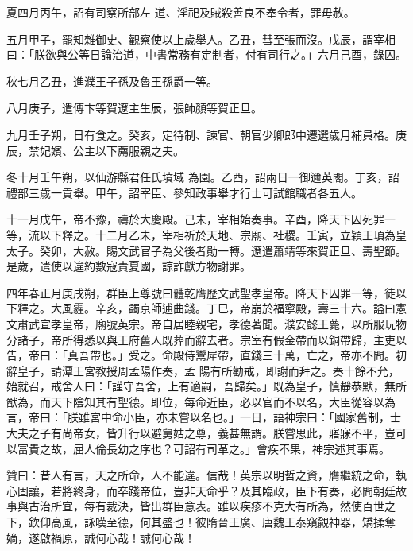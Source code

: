 \begin{pinyinscope}
 夏四月丙午，詔有司察所部左
 道、淫祀及賊殺善良不奉令者，罪毋赦。



 五月甲子，罷知雜御史、觀察使以上歲舉人。乙丑，彗至張而沒。戊辰，謂宰相曰：「朕欲與公等日論治道，中書常務有定制者，付有司行之。」六月己酉，錄囚。



 秋七月乙丑，進濮王子孫及魯王孫爵一等。



 八月庚子，遣傅卞等賀遼主生辰，張師顏等賀正旦。



 九月壬子朔，日有食之。癸亥，定待制、諫官、朝官少卿郎中遷選歲月補員格。庚辰，禁妃嬪、公主以下薦服親之夫。



 冬十月壬午朔，以仙游縣君任氏墳域
 為園。乙酉，詔兩日一御邇英閣。丁亥，詔禮部三歲一貢舉。甲午，詔宰臣、參知政事舉才行士可試館職者各五人。



 十一月戊午，帝不豫，禱於大慶殿。己未，宰相始奏事。辛酉，降天下囚死罪一等，流以下釋之。十二月乙未，宰相祈於天地、宗廟、社稷。壬寅，立穎王頊為皇太子。癸卯，大赦。賜文武官子為父後者勛一轉。遼遣蕭靖等來賀正旦、壽聖節。是歲，遣使以違約數寇責夏國，諒詐獻方物謝罪。



 四年春正月庚戌朔，群臣上尊號曰體乾膺歷文武聖孝皇帝。降天下囚罪一等，徒以下釋之。大風霾。辛亥，蠲京師逋曲錢。丁巳，帝崩於福寧殿，壽三十六。謚曰憲文肅武宣孝皇帝，廟號英宗。帝自居睦親宅，孝德著聞。濮安懿王薨，以所服玩物分諸子，帝所得悉以與王府舊人既葬而辭去者。宗室有假金帶而以銅帶歸，主吏以告，帝曰：「真吾帶也。」受之。命殿侍鬻犀帶，直錢三十萬，亡之，帝亦不問。初辭皇子，請潭王宮教授周孟陽作奏，孟
 陽有所勸戒，即謝而拜之。奏十餘不允，始就召，戒舍人曰：「謹守吾舍，上有適嗣，吾歸矣。」既為皇子，慎靜恭默，無所猷為，而天下陰知其有聖德。即位，每命近臣，必以官而不以名，大臣從容以為言，帝曰：「朕雖宮中命小臣，亦未嘗以名也。」一日，語神宗曰：「國家舊制，士大夫之子有尚帝女，皆升行以避舅姑之尊，義甚無謂。朕嘗思此，寤寐不平，豈可以富貴之故，屈人倫長幼之序也？可詔有司革之。」會疾不果，神宗述其事焉。



 贊曰：昔人有言，天之所命，人不能違。信哉！英宗以明哲之資，膺繼統之命，執心固讓，若將終身，而卒踐帝位，豈非天命乎？及其臨政，臣下有奏，必問朝廷故事與古治所宜，每有裁決，皆出群臣意表。雖以疾疹不克大有所為，然使百世之下，欽仰高風，詠嘆至德，何其盛也！彼隋晉王廣、唐魏王泰窺覦神器，矯揉奪嫡，遂啟禍原，誠何心哉！誠何心哉！



\end{pinyinscope}